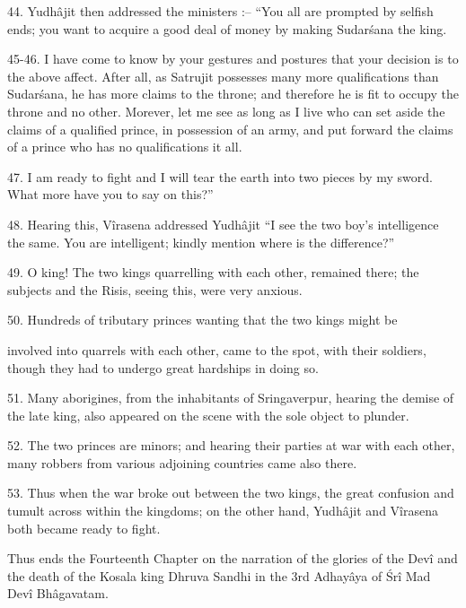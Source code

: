 44. Yudh\^ajit then addressed the ministers :-- ``You all are prompted by selfish ends; you want to acquire a good deal of money by making Sudar\'sana the king.

45-46. I have come to know by your gestures and postures that your decision is to the above affect. After all, as Satrujit possesses many more qualifications than Sudar\'sana, he has more claims to the throne; and therefore he is fit to occupy the throne and no other. Morever, let me see as long as I live who can set aside the claims of a qualified prince, in possession of an army, and put forward the claims of a prince who has no qualifications it all.

47. I am ready to fight and I will tear the earth into two pieces by my sword. What more have you to say on this?''

48. Hearing this, V\^irasena addressed Yudh\^ajit ``I see the two boy's intelligence the same. You are intelligent; kindly mention where is the difference?''

49. O king! The two kings quarrelling with each other, remained there; the subjects and the Risis, seeing this, were very anxious.

50. Hundreds of tributary princes wanting that the two kings might be

involved into quarrels with each other, came to the spot, with their soldiers, though they had to undergo great hardships in doing so.

51. Many aborigines, from the inhabitants of Sringaverpur, hearing the demise of the late king, also appeared on the scene with the sole object to plunder.

52. The two princes are minors; and hearing their parties at war with each other, many robbers from various adjoining countries came also there.

53. Thus when the war broke out between the two kings, the great confusion and tumult across within the kingdoms; on the other hand, Yudh\^ajit and V\^irasena both became ready to fight.

Thus ends the Fourteenth Chapter on the narration of the glories of the Dev\^i and the death of the Kosala king Dhruva Sandhi in the 3rd Adhay\^aya of \'Sr\^i Mad Dev\^i Bh\^agavatam.